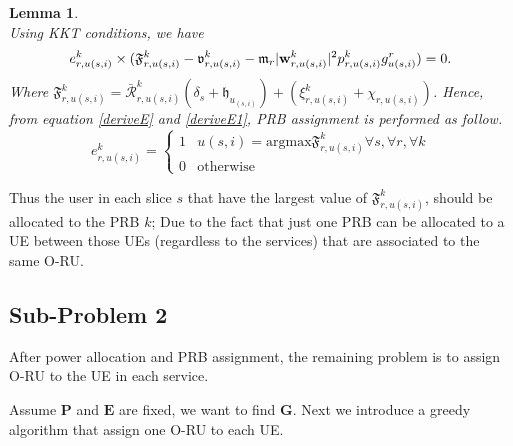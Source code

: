 \documentclass[conference]{IEEEtran}
\newtheorem{lemma}{Lemma}
\begin{document}
\begin{lemma}
\begin{equation}
\end{equation}
Using KKT conditions, we have
\begin{equation}\label{deriveE1}
e_{r,u(s,i)}^{k}\times (\mathfrak{F}^{k}_{r,u(s,i)} -\mathfrak{v}^{k}_{r,u(s,i)} - \mathfrak{m}_{r}|\bold{w}_{r,u(s,i)}^{k}|^2 p_{r,u(s,i)}^{k} g_{u(s,i)}^r ) = 0.
\end{equation}
Where $\mathfrak{F}^{k}_{r,u(s,i)} =\mathcal{\bar{R}}_{r,u(s,i)}^{k}(\delta_s+\mathfrak{h}_{u_{(s,i)}})+( \xi^{k}_{r,u(s,i)} +\chi_{r,u(s,i)}) $.
Hence, from equation \eqref{deriveE} and \eqref{deriveE1}, PRB assignment is performed as follow.
\begin{equation}
e_{r,u(s,i)}^{k} = 
  \begin{cases}
      1 & u(s,i) = \text{argmax} \mathfrak{F}^{k}_{r,u(s,i)} \forall s, \forall r, \forall k\\
      0 & \text{otherwise}
    \end{cases}
\end{equation}
\end{lemma}
Thus the user in each slice $s$ that have the largest value of $\mathfrak{F}^{k}_{r,u(s,i)}$, should be allocated to the PRB $k$; Due to the fact that just one PRB can be allocated to a UE between those UEs (regardless to the services) that are associated to the same O-RU.
\subsection{Sub-Problem 2}\label{sub2}
After power allocation and PRB assignment, the remaining problem is to assign O-RU to the UE in each service.

Assume $\boldsymbol{P}$ and $\boldsymbol{E}$ are fixed, we want to find $\boldsymbol{G}$.
Next we introduce a greedy algorithm that assign one O-RU to each UE.
\end{document}
